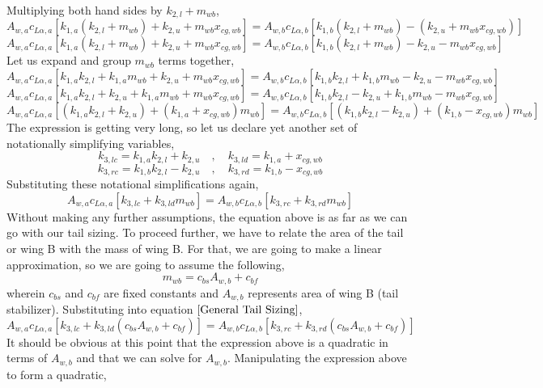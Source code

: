 Multiplying both hand sides by $k_{2,l} + m_{wb}$,
$$A_{w,a} c_{L\alpha,a} \left[k_{1,a}(k_{2,l} + m_{wb}) + k_{2,u} + m_{wb}x_{cg,wb} \right] = A_{w,b} c_{L\alpha,b}\left[k_{1,b}(k_{2,l} + m_{wb}) - (k_{2,u} + m_{wb}x_{cg,wb})\right] $$
$$A_{w,a} c_{L\alpha,a} \left[k_{1,a}(k_{2,l} + m_{wb}) + k_{2,u} + m_{wb}x_{cg,wb} \right] = A_{w,b} c_{L\alpha,b}\left[k_{1,b}(k_{2,l} + m_{wb}) - k_{2,u} - m_{wb}x_{cg,wb}\right]$$
Let us expand and group $m_{wb}$ terms together,
$$A_{w,a} c_{L\alpha,a} \left[k_{1,a}k_{2,l} + k_{1,a}m_{wb} + k_{2,u} + m_{wb}x_{cg,wb} \right] = A_{w,b} c_{L\alpha,b}\left[k_{1,b}k_{2,l} + k_{1,b}m_{wb} - k_{2,u} - m_{wb}x_{cg,wb}\right]$$
$$A_{w,a} c_{L\alpha,a} \left[k_{1,a}k_{2,l} + k_{2,u} + k_{1,a}m_{wb} + m_{wb}x_{cg,wb} \right] = A_{w,b} c_{L\alpha,b}\left[k_{1,b}k_{2,l} - k_{2,u} + k_{1,b}m_{wb} - m_{wb}x_{cg,wb}\right]$$
$$A_{w,a} c_{L\alpha,a} \left[(k_{1,a}k_{2,l} + k_{2,u}) + (k_{1,a} + x_{cg,wb})m_{wb}\right] = A_{w,b} c_{L\alpha,b}\left[(k_{1,b}k_{2,l} - k_{2,u}) + (k_{1,b} - x_{cg,wb})m_{wb} \right]$$
The expression is getting very long, so let us declare yet another set of notationally simplifying variables,
\begin{equation}k_{3,lc} = k_{1,a}k_{2,l} + k_{2,u} \quad,\quad k_{3,ld} = k_{1,a} + x_{cg,wb} \label{k3 definitions left}\end{equation}
\begin{equation}k_{3,rc} = k_{1,b}k_{2,l} - k_{2,u} \quad,\quad k_{3,rd} = k_{1,b} - x_{cg,wb} \label{k3 definitions right}\end{equation}
Substituting these notational simplifications again,
\begin{equation}A_{w,a} c_{L\alpha,a} \left[k_{3,lc} + k_{3,ld}m_{wb}\right] = A_{w,b} c_{L\alpha,b}\left[k_{3,rc} + k_{3,rd}m_{wb} \right] \label{General Tail Sizing}\end{equation}
Without making any further assumptions, the equation above is as far as we can go with our tail sizing. To proceed further, we have to relate the area of the tail or wing B with the mass of wing B. For that, we are going to make a linear approximation, so we are going to assume the following,
$$m_{wb} = c_{bs}A_{w,b} + c_{bf}$$
wherein $c_{bs}$ and $c_{bf}$ are fixed constants and $A_{w,b}$ represents area of wing B (tail stabilizer). Substituting into equation $\ref{General Tail Sizing}$,
$$A_{w,a} c_{L\alpha,a} \left[k_{3,lc} + k_{3,ld} (c_{bs}A_{w,b} + c_{bf}) \right] = A_{w,b} c_{L\alpha,b}\left[k_{3,rc} + k_{3,rd} (c_{bs}A_{w,b} + c_{bf})\right] $$
It should be obvious at this point that the expression above is a quadratic in terms of $A_{w,b}$ and that we can solve for $A_{w,b}$. Manipulating the expression above to form a quadratic,
